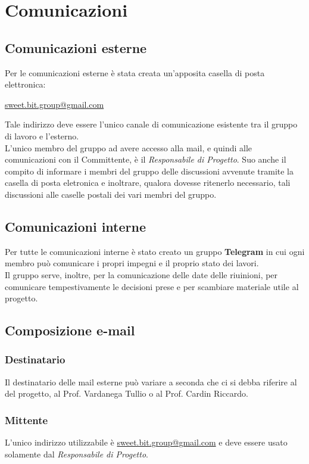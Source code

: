 \section{Comunicazioni}
  \subsection{Comunicazioni esterne}
    Per le comunicazioni esterne è stata creata un'apposita casella di posta elettronica:\\
      \begin{center}
        \href{mailto:sweet.bit.group@gmail.com}{sweet.bit.group@gmail.com}
      \end{center}
    Tale indirizzo deve essere l’unico canale di comunicazione esistente tra il gruppo di lavoro e l’esterno.\\
    L'unico membro del gruppo ad avere accesso alla mail, e quindi alle comunicazioni con il Committente, è il \emph{Responsabile di Progetto}.
    Suo anche il compito di informare i membri del gruppo delle discussioni avvenute tramite la casella di posta eletronica e inoltrare, qualora dovesse ritenerlo necessario,
    tali discussioni alle caselle postali dei vari membri del gruppo.
  \subsection{Comunicazioni interne}
    Per tutte le comunicazioni interne è stato creato un gruppo \textbf{Telegram} in cui ogni membro può comunicare i propri impegni e il proprio stato dei lavori.\\
    Il gruppo serve, inoltre, per la comunicazione delle date delle riuinioni, per comunicare tempestivamente le decisioni prese e per scambiare materiale utile al progetto.
  \subsection{Composizione e-mail}
    \subsubsection{Destinatario}
      Il destinatario delle mail esterne può variare a seconda che ci si debba riferire al  del progetto, al Prof. Vardanega Tullio o al Prof. Cardin Riccardo.
    \subsubsection{Mittente}
      L’unico indirizzo utilizzabile è \href{mailto:sweet.bit.group@gmail.com}{sweet.bit.group@gmail.com} e deve essere usato solamente dal \emph{Responsabile di Progetto}.
